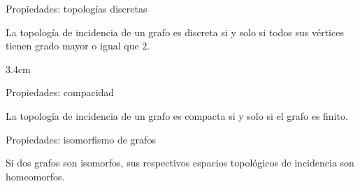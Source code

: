 \begin{frame}{Propiedades: topologías discretas}
   \begin{prop}
      La topología de incidencia de un grafo es \alert{discreta} si y solo si todos sus vértices tienen \alert{grado mayor o igual que $2$}.\vspace{0.3cm}
   \end{prop}
   \vspace{0.3cm}
   \hspace*{-0.22cm}%
   \begin{minipage}{\textwidth}
   \begin{overlayarea}{\textwidth}{3.4cm}
   \end{overlayarea}
   \end{minipage}
\end{frame}
\begin{frame}{Propiedades: compacidad}
   \begin{prop}
      La topología de incidencia de un grafo es \alert{compacta} si y solo si el grafo es \alert{finito}.\vspace{0.3cm}
   \end{prop}
\end{frame}
\begin{frame}{Propiedades: isomorfismo de grafos}
   \begin{prop}
      Si dos grafos son \alert{isomorfos}, sus respectivos espacios topológicos de incidencia son \alert{homeomorfos}.\vspace{0.3cm}
   \end{prop}
\end{frame}

